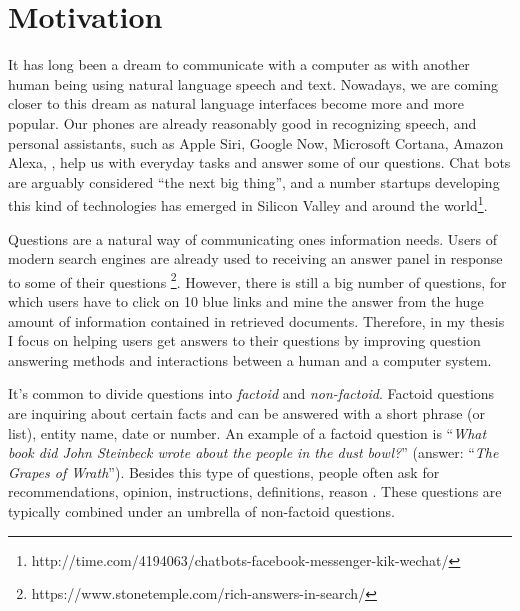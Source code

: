 %
%
\label{chapter:intro}

\setcounter{page}{1}
\pagestyle{myheadings}


\newtheorem{definition}{Definition}
\newtheorem{proposition}{Proposition}


\section{Motivation}

It has long been a dream to communicate with a computer as with another human being using natural language speech and text.
Nowadays, we are coming closer to this dream as natural language interfaces become more and more popular.
Our phones are already reasonably good in recognizing speech, and personal assistants, such as Apple Siri, Google Now, Microsoft Cortana, Amazon Alexa, \etc, help us with everyday tasks and answer some of our questions.
Chat bots are arguably considered ``the next big thing'', and a number startups developing this kind of technologies has emerged in Silicon Valley and around the world\footnote{http://time.com/4194063/chatbots-facebook-messenger-kik-wechat/}.

Questions are a natural way of communicating ones information needs.
Users of modern search engines are already used to receiving an answer panel in response to some of their questions \footnote{https://www.stonetemple.com/rich-answers-in-search/}.
However, there is still a big number of questions, for which users have to click on 10 blue links and mine the answer from the huge amount of information contained in retrieved documents.
Therefore, in my thesis I focus on helping users get answers to their questions by improving question answering methods and interactions between a human and a computer system.

It's common to divide questions into \textit{factoid} and \textit{non-factoid}.
Factoid questions are inquiring about certain facts and can be answered with a short phrase (or list), \ie entity name, date or number.
An example of a factoid question is ``\textit{What book did John Steinbeck wrote about the people in the dust bowl?}'' (answer: ``\textit{The Grapes of Wrath}'').
Besides this type of questions, people often ask for recommendations, opinion, instructions, definitions, reason \etc.
These questions are typically combined under an umbrella of non-factoid questions.

